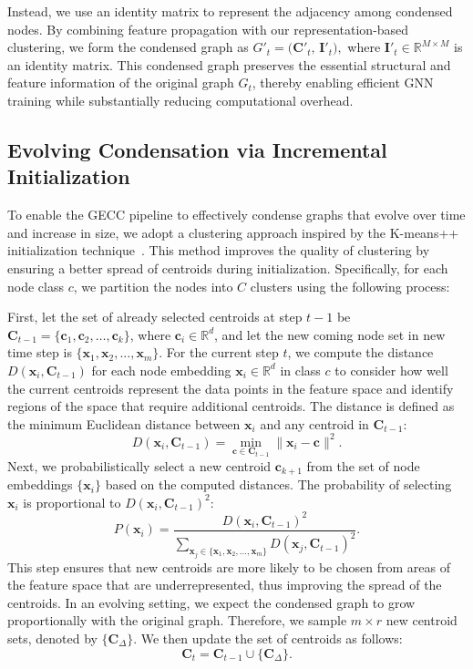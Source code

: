 Instead, we use an identity matrix to represent the adjacency among condensed nodes. By combining feature propagation with our representation-based clustering, we form the condensed graph as
$G'_t = \bigl(\mathbf{C}'_{t},\,\mathbf{I}'_{t}\bigr),$
where $\mathbf{I}'_{t}\in \mathbb{R}^{M\times M}$ is an identity matrix. This condensed graph preserves the essential structural and feature information of the original graph \(G_t\), thereby enabling efficient GNN training while substantially reducing computational overhead.


\subsection{Evolving Condensation via Incremental Initialization }
To enable the GECC pipeline to effectively condense graphs that evolve over time and increase in size, we adopt a clustering approach inspired by the K-means++ initialization technique~\citep{arthur2006k}. This method improves the quality of clustering by ensuring a better spread of centroids during initialization. Specifically, for each node class \( c \), we partition the nodes into \( C \) clusters using the following process:

First, let the set of already selected centroids at step \( t-1 \) be \( \mathbf{C}_{t-1} = \{\mathbf{c}_1, \mathbf{c}_2, \dots, \mathbf{c}_k\} \), where \( \mathbf{c}_i \in \mathbb{R}^d \), and let the new coming node set in new time step is $\{\mathbf{x}_1,\mathbf{x}_{2},...,\mathbf{x}_m\}$. For the current step \( t \), we compute the distance \( D(\mathbf{x}_i, \mathbf{C}_{t-1}) \) for each node embedding \( \mathbf{x}_i \in \mathbb{R}^d \) in class \( c \) to consider how well the current centroids represent the data points in the feature space and identify regions of the space that require additional centroids. The distance is defined as the minimum Euclidean distance between \( \mathbf{x}_i \) and any centroid in \( \mathbf{C}_{t-1} \):
\[
D(\mathbf{x}_i, \mathbf{C}_{t-1}) = \min_{\mathbf{c} \in \mathbf{C}_{t-1}} \|\mathbf{x}_i - \mathbf{c}\|^2.
\]
Next, we probabilistically select a new centroid \( \mathbf{c}_{k+1} \) from the set of node embeddings \( \{\mathbf{x}_i\} \) based on the computed distances. The probability of selecting \( \mathbf{x}_i \) is proportional to \( D(\mathbf{x}_i, \mathbf{C}_{t-1})^2 \):
\[
P(\mathbf{x}_i) = \frac{D(\mathbf{x}_i, \mathbf{C}_{t-1})^2}{\sum_{\mathbf{x}_j \in \{\mathbf{x}_1,\mathbf{x}_{2},...,\mathbf{x}_m\}} D(\mathbf{x}_j, \mathbf{C}_{t-1})^2}.
\]
This step ensures that new centroids are more likely to be chosen from areas of the feature space that are underrepresented, thus improving the spread of the centroids. 
In an evolving setting, we expect the condensed graph to grow proportionally with the original graph. Therefore, we sample \(m \times r\) new centroid sets, denoted by \(\{\mathbf{C}_{\Delta}\}\). We then update the set of centroids as follows:
\[
\mathbf{C}_t = \mathbf{C}_{t-1} \cup \{\mathbf{C}_{\Delta}\}.
\]

